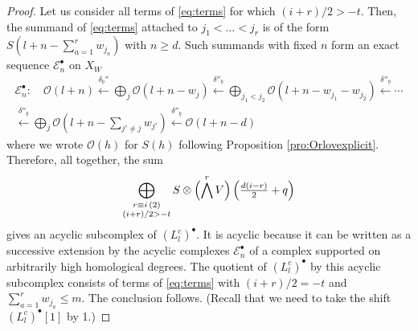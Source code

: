 \documentclass[11pt]{amsart}
\theoremstyle{definition} %
\theoremstyle{remark} %
\newcommand{\Ocal}{\mathcal O}
\newcommand{\cE}{\mathcal{E}}
\newcommand{\ub}{\underline{b}}
\begin{document}
\begin{proof}
Let us consider all terms of \eqref{eq:terms} 
for which $(i+r)/2> -t$. 
Then, the summand of \eqref{eq:terms} 
attached to $j_1<\dots<j_r$ is of the form 
$S(l+n-\sum_{a=1}^r w_{j_a})$ with $n\ge d$. 
Such summands with fixed $n$ 
form an exact sequence $\cE_n^\bullet$ on $X_W$
\begin{multline}
\label{eq:exactseq}
\cE_n^\bullet: \quad 
\Ocal(l+n)\overset{\delta_{\ub}''}
\longleftarrow \bigoplus_j \Ocal(l+n-w_j)
\overset{\delta''_{\ub}}\longleftarrow 
\bigoplus_{j_1<j_2}\Ocal(l+n-w_{j_1}-w_{j_2})
\overset{\delta''_{\ub}}\longleftarrow  \cdots \\ 
\overset{\delta''_{\ub}}{\longleftarrow} 
\bigoplus_j \Ocal\left( l + n -\textstyle\sum_{j'\neq j} w_{j'}\right)
\overset{\delta''_{\ub}}\longleftarrow  \Ocal(l +n-d)
\end{multline} 
where we wrote $\Ocal(h)$ for $S(h)$ 
following Proposition \ref{pro:Orlovexplicit}. 
Therefore, all together, the sum  
\[ 
\bigoplus_{\substack{r\equiv i \, (2) \\ 
(i+r)/2 > -t }} 
S\otimes \Bigl( \bigwedge^r V\Bigr) \left(  
\textstyle \frac{d(i-r)}{2} +q \right) 
\] 
gives an acyclic subcomplex of $(L^{c}_l)^\bullet$. 
It is acyclic because it can be written 
as a successive extension by the 
acyclic complexes $\cE_n^\bullet$ 
of a complex supported on arbitrarily 
high homological degrees.  
The quotient of $(L^c_l)^\bullet$ 
by this acyclic subcomplex consists of 
terms of \eqref{eq:terms} 
with $(i+r)/2 =-t$ 
and $\sum_{a=1}^r w_{j_a} \le m$. 
The conclusion follows. (Recall that 
we need to take the shift $(L^c_l)^\bullet[1]$ by 1.)  
\end{proof}
\end{document}
